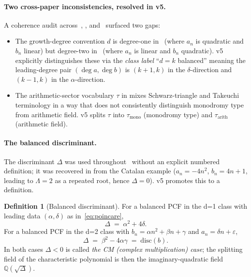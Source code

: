 \documentclass[12pt]{amsart}
\theoremstyle{definition}
\newtheorem{definition}[theorem]{Definition}
\begin{document}
\paragraph{Two cross-paper inconsistencies, resolved in v5.}
A coherence audit across~\cite{Papanokechi2026Spec},
\cite{Papanokechi2026F24}, and~\cite{Papanokechi2026Vquad} surfaced two
gaps:
\begin{itemize}
\item[(I-1)] The growth-degree convention $d$ is degree-one
in~\cite{Papanokechi2026F24} (where $a_{n}$ is quadratic and $b_{n}$ linear)
but degree-two in~\cite{Papanokechi2026Vquad} (where $a_{n}$ is linear and
$b_{n}$ quadratic). v5 explicitly distinguishes these via the
\emph{class label} ``$d=k$ balanced'' meaning the leading-degree pair
$(\deg a,\deg b)$ is $(k+1,k)$ in the $\delta$-direction and $(k-1,k)$ in
the $\alpha$-direction.
\item[(I-2)] The arithmetic-sector vocabulary $\tau$ in
\cite{Papanokechi2026Spec} mixes Schwarz-triangle and Takeuchi terminology
in a way that does not consistently distinguish monodromy type from
arithmetic field. v5 splits $\tau$ into $\tau_{\mathrm{mono}}$ (monodromy
type) and $\tau_{\mathrm{arith}}$ (arithmetic field).
\end{itemize}

\paragraph{The balanced discriminant.}
The discriminant $\Delta$ was used throughout~\cite{Papanokechi2026Spec}
without an explicit numbered definition; it was recovered in
\cite{Papanokechi2026F24} from the Catalan example
($a_{n}=-4n^{2}$, $b_{n}=4n+1$, leading to $\Lambda=2$ as a repeated root,
hence $\Delta=0$). v5 promotes this to a definition.

\begin{definition}[Balanced discriminant]\label{def:Delta}
For a balanced PCF in the d=1 class with leading data
$(\alpha,\delta)$ as in~\eqref{eq:poincare},
\[
\Delta \;=\; \alpha^{2}+4\delta.
\]
For a balanced PCF in the d=2 class with $b_{n}=\alpha n^{2}+\beta n+\gamma$
and $a_{n}=\delta n+\varepsilon$,
\[
\Delta \;=\; \beta^{2}-4\alpha\gamma \;=\; \mathrm{disc}(b).
\]
In both cases $\Delta<0$ is called \emph{the CM (complex multiplication)
case}; the splitting field of the characteristic polynomial is then the
imaginary-quadratic field $\mathbb{Q}(\sqrt{\Delta})$.
\end{definition}
\end{document}
